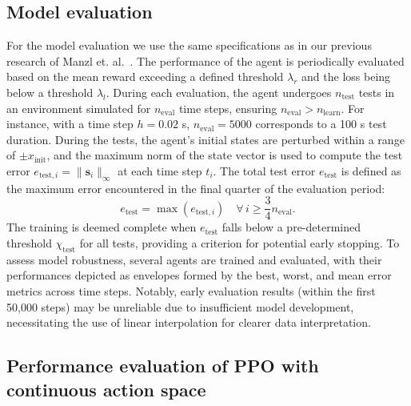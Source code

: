 \subsection{Model evaluation} \label{Model evaluation}

For the model evaluation we use the same specifications as in our previous research of Manzl et. al.~\cite{manzl2023relrl}. The performance of the agent is periodically evaluated based on the mean reward exceeding a defined threshold \( \lambda_r \) and the loss being below a threshold \( \lambda_l \). During each evaluation, the agent undergoes \( n_{\text{test}} \) tests in an environment simulated for \( n_{\text{eval}} \) time steps, ensuring \( n_{\text{eval}} > n_{\text{learn}} \). For instance, with a time step \( h = 0.02 \) s, \( n_{\text{eval}} = 5000 \) corresponds to a 100 s test duration. During the tests, the agent's initial states are perturbed within a range of \( \pm x_{\text{init}} \), and the maximum norm of the state vector is used to compute the test error \( e_{\text{test},i} = \|\mathbf{s}_i\|_{\infty} \) at each time step \( t_i \). The total test error \( e_{\text{test}} \) is defined as the maximum error encountered in the final quarter of the evaluation period:
\begin{equation}
	e_{\text{test}} = \max(e_{\text{test},i}) \quad \forall \, i \geq \frac{3}{4}n_{\text{eval}}.
\end{equation}
The training is deemed complete when \( e_{\text{test}} \) falls below a pre-determined threshold \( \chi_{\text{test}} \) for all tests, providing a criterion for potential early stopping. To assess model robustness, several agents are trained and evaluated, with their performances depicted as envelopes formed by the best, worst, and mean error metrics across time steps. Notably, early evaluation results (within the first 50,000 steps) may be unreliable due to insufficient model development, necessitating the use of linear interpolation for clearer data interpretation.

\subsection{Performance evaluation of PPO with continuous action space} \label{subsec: Performance Evaluation of PPO with Discrete and Continuous Action Spaces}

